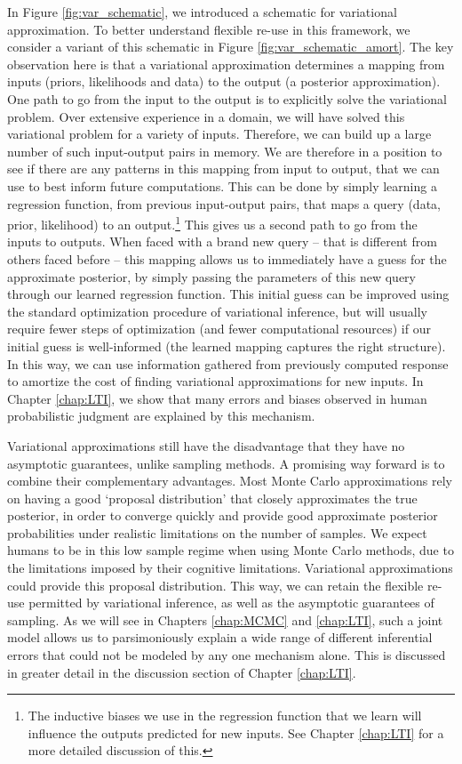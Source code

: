 In Figure \ref{fig:var_schematic}, we introduced a schematic for variational approximation. To better understand flexible re-use in this framework, we consider a variant of this schematic in Figure \ref{fig:var_schematic_amort}. The key observation here is that a variational approximation determines a mapping from inputs (priors, likelihoods and data) to the output (a posterior approximation). One path to go from the input to the output is to explicitly solve the variational problem. Over extensive experience in a domain, we will have solved this variational problem for a variety of inputs. Therefore, we can build up a large number of such input-output pairs in memory. We are therefore in a position to see if there are any patterns in this mapping from input to output, that we can use to best inform future computations. This can be done by simply learning a regression function, from previous input-output pairs, that maps a query (data, prior, likelihood) to an output.\footnote{The inductive biases we use in the regression function that we learn will influence the outputs predicted for new inputs. See Chapter \ref{chap:LTI} for a more detailed discussion of this.} This gives us a second path to go from the inputs to outputs. When faced with a brand new query -- that is different from others faced before -- this mapping allows us to immediately have a guess for the approximate posterior, by simply passing the parameters of this new query through our learned regression function. This initial guess can be improved using the standard optimization procedure of variational inference, but will usually require fewer steps of optimization (and fewer computational resources) if our initial guess is well-informed (the learned mapping captures the right structure). In this way, we can use information gathered from previously computed response to amortize the cost of finding variational approximations for new inputs. In Chapter \ref{chap:LTI}, we show that many errors and biases observed in human probabilistic judgment are explained by this mechanism.

Variational approximations still have the disadvantage that they have no asymptotic guarantees, unlike sampling methods. A promising way forward is to combine their complementary advantages. Most Monte Carlo approximations rely on having a good `proposal distribution' that closely approximates the true posterior, in order to converge quickly and provide good approximate posterior probabilities under realistic limitations on the number of samples. We expect humans to be in this low sample regime when using Monte Carlo methods, due to the limitations imposed by their cognitive limitations. Variational approximations could provide this proposal distribution. This way, we can retain the flexible re-use permitted by variational inference, as well as the asymptotic guarantees of sampling. As we will see in Chapters \ref{chap:MCMC} and \ref{chap:LTI}, such a joint model allows us to parsimoniously explain a wide range of different inferential errors that could not be modeled by any one mechanism alone. This is discussed in greater detail in the discussion section of Chapter \ref{chap:LTI}.

